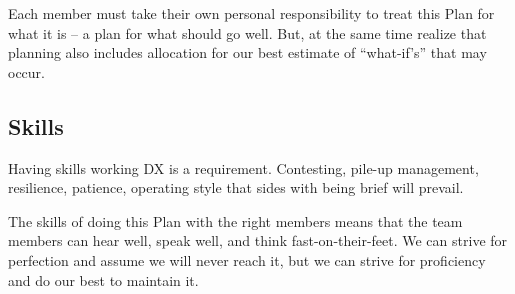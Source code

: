 \documentclass[11pt]{article}
\begin{document}
Each member must take their own personal responsibility to
treat this Plan for what it is -- a plan for what
should go well.   But, at the same time realize that
planning also includes allocation for our best
estimate of ``what-if's'' that may occur.
   
\subsection{Skills}
Having skills working DX is a requirement.  Contesting,
pile-up management, resilience, patience, operating
style that sides with being brief will prevail.
\par
The skills of doing this Plan with the right members
means that the team members can hear well, speak well,
and think fast-on-their-feet.  We can strive for
perfection and assume we will never reach it, but we
can strive for proficiency and do our best to maintain
it.
\end{document}
